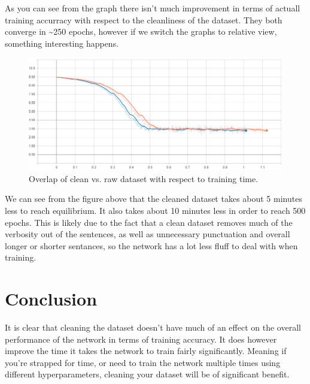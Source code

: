 \documentclass[titlepage]{article}
\begin{document}
As you can see from the graph there isn't much improvement in terms of actuall training accurracy with respect to the cleanliness of the dataset. They both converge in \textasciitilde 250 epochs, however if we switch the graphs to relative view, something interesting happens.
\begin{figure}[H]
	\centering
	\includegraphics[width=120mm]{cost-overlap-relative-001.png}
	\caption{Overlap of clean vs. raw dataset with respect to training time.}
	\label{fig:cor001}
\end{figure} 
We can see from the figure above that the cleaned dataset takes about 5 minutes less to reach equilibrium. It also takes about 10 minutes less in order to reach 500 epochs. This is likely due to the fact that a clean dataset removes much of the verbosity out of the sentences, as well as unnecessary punctuation and overall longer or shorter sentances, so the network has a lot less fluff to deal with when training. 

\section{Conclusion}
It is clear that cleaning the dataset doesn't have much of an effect on the overall performance of the network in terms of training accuracy. It does however improve the time it takes the network to train fairly significantly. Meaning if you're strapped for time, or need to train the network multiple times using different hyperparameters, cleaning your dataset will be of significant benefit.
\end{document}
